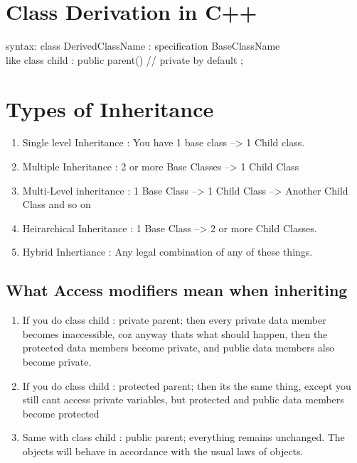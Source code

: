\documentclass[11pt]{article}
\begin{document}
\section{Class Derivation in C++}
syntax: class DerivedClassName : specification BaseClassName\\
like class child : public parent() // private by default
{};

\section{Types of Inheritance}
{
	\begin{enumerate}
		\item Single level Inheritance : You have 1 base class --> 1 Child class.
		\item Multiple Inheritance : 2 or more Base Classes --> 1 Child Class
		\item Multi-Level inheritance : 1 Base Class --> 1 Child Class --> Another Child Class and so on
		\item Heirarchical Inheritance : 1 Base Class --> 2 or more Child Classes. 
		\item Hybrid Inhertiance : Any legal combination of any of these things. 
	\end{enumerate}
}

\subsection{What Access modifiers mean when inheriting}
\begin{enumerate}
	\item If you do class child : private parent; then every private data member becomes inaccessible, coz anyway thats what should happen, then the protected data members become private, and public data members also become private. 
	\item If you do class child : protected parent; then its the same thing, except you still cant access private variables, but protected and public data members become protected
	\item Same with class child : public parent; everything remains unchanged. The objects will behave in accordance with the usual laws of objects.  
\end{enumerate}
\end{document}
